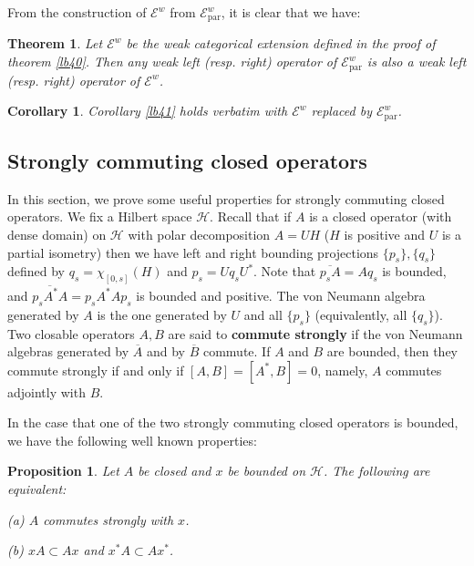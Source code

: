 \documentclass[11pt,b5paper,notitlepage]{article}
\theoremstyle{definition}
\theoremstyle{plain}
\newtheorem{thm}[df]{Theorem}
\newtheorem{pp}[df]{Proposition}
\newtheorem{co}[df]{Corollary}
\newcommand{\mc}{\mathcal}
\newcommand{\ovl}{\overline}
\newcommand{\loc}{\mathrm{par}}
\newcommand{\scr}{\mathscr}
\numberwithin{equation}{subsection}
\begin{document}
From the construction of $\scr E^w$ from $\scr E^w_\loc$, it is clear that we have:

\begin{thm}
Let $\scr E^w$ be the weak categorical extension defined in the proof of theorem \ref{lb40}. Then any weak left (resp. right) operator of $\scr E^w_{\loc}$ is also a weak left (resp. right) operator of $\scr E^w$.
\end{thm}


\begin{co}\label{lb62}
Corollary \ref{lb41} holds verbatim with $\scr E^w$ replaced by $\scr E^w_\loc$.
\end{co}



\begin{subappendices}



\subsection{Strongly commuting closed operators}\label{lb9}

In this section, we prove some useful properties for strongly commuting closed operators. We fix a Hilbert space $\mc H$. Recall that if $A$ is a closed operator (with dense domain) on $\mc H$ with polar decomposition $A=UH$ ($H$ is positive and $U$ is a partial isometry)  then we have left and right bounding projections $\{p_s\},\{q_s\}$ defined by  $q_s=\chi_{[0,s]}(H)$ and $p_s=Uq_sU^*$. Note that $\ovl{p_sA}=Aq_s$ is bounded, and $\ovl{p_sA^*A}=p_s A^*Ap_s$ is bounded and positive. The von Neumann algebra generated by $A$ is the one generated by $U$ and all $\{p_s\}$ (equivalently, all $\{q_s\}$). Two closable operators $A,B$ are said to \textbf{commute strongly} if the von Neumann algebras generated by $\ovl{A}$ and by $\ovl{B}$ commute. If $A$ and $B$ are bounded, then they commute strongly if and only if $[A,B]=[A^*,B]=0$, namely, $A$ commutes adjointly with $B$.

In the case that one of the two strongly commuting closed operators is bounded, we have the following well known properties:

\begin{pp}\label{lb15}
	Let $A$ be closed and $x$ be bounded on $\mc H$. The following are equivalent:
	
	(a) $A$ commutes strongly with $x$.
	
	(b) $xA\subset Ax$ and $x^*A\subset Ax^*$.
	

\end{pp}
\end{subappendices}
\end{document}
